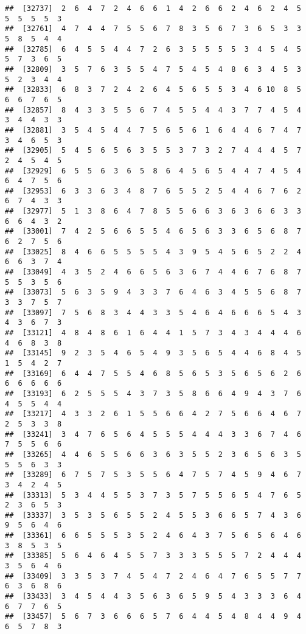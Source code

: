 \documentclass[
]{book}
\begin{document}
\begin{verbatim}
##  [32737]  2  6  4  7  2  4  6  6  1  4  2  6  6  2  4  6  2  4  5  5  5  5  5  3
##  [32761]  4  7  4  4  7  5  5  6  7  8  3  5  6  7  3  6  5  3  3  5  8  5  4  4
##  [32785]  6  4  5  5  4  4  7  2  6  3  5  5  5  5  3  4  5  4  5  5  7  3  6  5
##  [32809]  3  5  7  6  3  5  5  4  7  5  4  5  4  8  6  3  4  5  3  5  2  3  4  4
##  [32833]  6  8  3  7  2  4  2  6  4  5  6  5  5  3  4  6 10  8  5  6  6  7  6  5
##  [32857]  8  4  3  3  5  5  6  7  4  5  5  4  4  3  7  7  4  5  4  3  4  4  3  3
##  [32881]  3  5  4  5  4  4  7  5  6  5  6  1  6  4  4  6  7  4  7  3  4  6  5  3
##  [32905]  5  4  5  6  5  6  3  5  5  3  7  3  2  7  4  4  4  5  7  2  4  5  4  5
##  [32929]  6  5  5  6  3  6  5  8  6  4  5  6  5  4  4  7  4  5  4  6  4  7  5  6
##  [32953]  6  3  3  6  3  4  8  7  6  5  5  2  5  4  4  6  7  6  2  6  7  4  3  3
##  [32977]  5  1  3  8  6  4  7  8  5  5  6  6  3  6  3  6  6  3  3  6  6  4  3  2
##  [33001]  7  4  2  5  6  6  5  5  4  6  5  6  3  3  6  5  6  8  7  6  2  7  5  6
##  [33025]  8  4  6  6  5  5  5  5  4  3  9  5  4  5  6  5  2  2  4  6  6  3  7  4
##  [33049]  4  3  5  2  4  6  6  5  6  3  6  7  4  4  6  7  6  8  7  5  5  3  5  6
##  [33073]  5  6  3  5  9  4  3  3  7  6  4  6  3  4  5  5  6  8  7  3  3  7  5  7
##  [33097]  7  5  6  8  3  4  4  3  3  5  4  6  4  6  6  6  5  4  3  4  3  6  7  3
##  [33121]  4  8  4  8  6  1  6  4  4  1  5  7  3  4  3  4  4  4  6  4  6  8  3  8
##  [33145]  9  2  3  5  4  6  5  4  9  3  5  6  5  4  4  6  8  4  5  1  5  4  2  7
##  [33169]  6  4  4  7  5  5  4  6  8  5  6  5  3  5  6  5  6  2  6  6  6  6  6  6
##  [33193]  6  2  5  5  5  4  3  7  3  5  8  6  6  4  9  4  3  7  6  4  5  5  4  4
##  [33217]  4  3  3  2  6  1  5  5  6  6  4  2  7  5  6  6  4  6  7  2  5  3  3  8
##  [33241]  3  4  7  6  5  6  4  5  5  5  4  4  4  3  3  6  7  4  6  7  5  5  6  6
##  [33265]  4  4  6  5  5  6  6  3  6  3  5  5  2  3  6  5  6  3  5  5  5  6  3  3
##  [33289]  6  7  5  7  5  3  5  5  6  4  7  5  7  4  5  9  4  6  7  3  4  2  4  5
##  [33313]  5  3  4  4  5  5  3  7  3  5  7  5  5  6  5  4  7  6  5  2  3  6  5  3
##  [33337]  3  5  3  5  6  5  5  2  4  5  5  3  6  6  5  7  4  3  6  9  5  6  4  6
##  [33361]  6  6  5  5  5  3  5  2  4  6  4  3  7  5  6  5  6  4  6  3  8  5  3  5
##  [33385]  5  6  4  6  4  5  5  7  3  3  3  5  5  5  7  2  4  4  4  3  5  6  4  6
##  [33409]  3  3  5  3  7  4  5  4  7  2  4  6  4  7  6  5  5  7  7  6  3  6  8  6
##  [33433]  3  4  5  4  4  3  5  6  3  6  5  9  5  4  3  3  3  6  4  6  7  7  6  5
##  [33457]  5  6  7  3  6  6  6  5  7  6  4  4  5  4  8  4  4  9  4  6  5  7  8  3

\end{verbatim}
\end{document}
